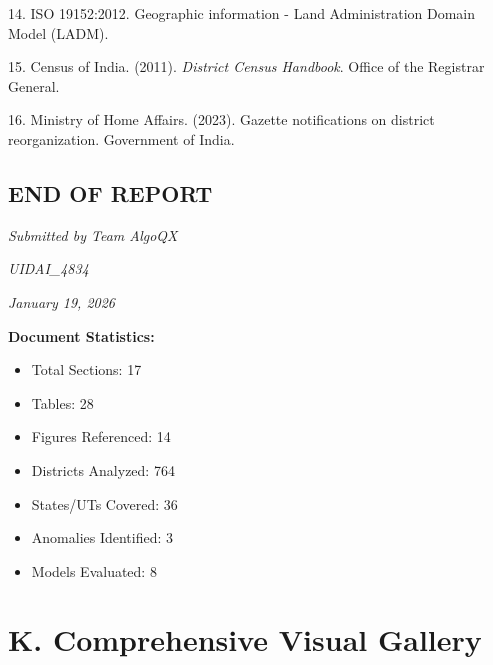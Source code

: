 \documentclass[11pt, a4paper]{article}
\begin{document}
14. ISO 19152:2012. Geographic information - Land Administration Domain Model (LADM).


15. Census of India. (2011). \textit{District Census Handbook}. Office of the Registrar General.


16. Ministry of Home Affairs. (2023). Gazette notifications on district reorganization. Government of India.






\subsection{END OF REPORT}

\textit{Submitted by Team AlgoQX}

\textit{UIDAI\_4834}

\textit{January 19, 2026}




\textbf{Document Statistics:}


\begin{itemize}
\item Total Sections: 17

\item Tables: 28

\item Figures Referenced: 14

\item Districts Analyzed: 764

\item States/\allowbreak UTs Covered: 36

\item Anomalies Identified: 3

\item Models Evaluated: 8
\end{itemize}

\clearpage
\section*{K. Comprehensive Visual Gallery}
\end{document}
